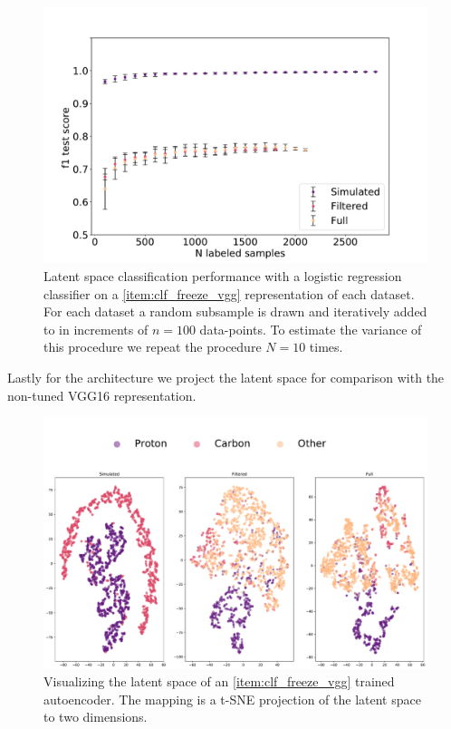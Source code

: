 \begin{figure}
\centering
\includegraphics[width=\textwidth]{plots/vgg_ac_n_samples.pdf}
\caption[Autoencoder performance on labeled subsets]{Latent space classification performance with a logistic regression classifier on a \ref{item:clf_freeze_vgg} representation of each dataset. For each dataset a random subsample is drawn and iteratively added to in increments of $n=100$ data-points. To estimate the variance of this procedure we repeat the procedure $N=10$ times.}\label{fig:vgg_ac_n_labeled}
\end{figure}

Lastly for the architecture we project the latent space for comparison with the non-tuned VGG16 representation. 


\begin{figure}
\centering
\includegraphics[width=\textwidth]{plots/vgg_ac_tsne.pdf}
\caption[VGG16-autoencoder latent space visualization]{Visualizing the latent space of an \ref{item:clf_freeze_vgg} trained autoencoder. The mapping is a t-SNE projection of the latent space to two dimensions.}\label{fig:ac_tnse}
\end{figure}
